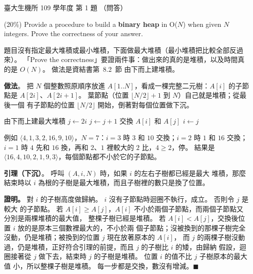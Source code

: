 \begin{pastexam}[label={px:ntu-109-bime-ds-01}]{臺大生機所 109 學年度 第 1 題}
（問答）

(20\%) Provide a procedure to build a \textbf{binary heap} in O($N$) when given $N$ integers.
Prove the correctness of your answer.
\end{pastexam}

\begin{pastsoln}
題目沒有指定最大堆積或最小堆積，下面做最大堆積（最小堆積把比較全部反過來）。 「Prove the
correctness」要證兩件事：做出來的真的是堆積，以及時間真的是 $O(N)$。 做法是資結書第~8.2~節
由下而上建堆積。

\textbf{做法}。 把 $N$ 個整數照原順序放進 $A[1..N]$，看成一棵完整二元樹：$A[i]$ 的子節點是
$A[2i]$、$A[2i+1]$。 葉節點（位置 $\lfloor N/2 \rfloor + 1$ 到 $N$）自己就是堆積；從最後一個
有子節點的位置 $\lfloor N/2 \rfloor$ 開始，倒著對每個位置做下沉。
\begin{pseudo}{由下而上建最大堆積}
        \State $j \gets 2i$ 
            \State $j \gets j + 1$ 
        \EndIf
            \State \Return
        \EndIf
        \State 交換 $A[i]$ 和 $A[j]$
        \State $i \gets j$
    \EndWhile
\EndProcedure
\Statex
{}
        \State {}
    \EndFor
\EndProcedure
\end{pseudo}
例如 $\langle 4, 1, 3, 2, 16, 9, 10 \rangle$，$N = 7$：$i = 3$ 時 $3$ 和 $10$ 交換；$i = 2$ 時
$1$ 和 $16$ 交換；$i = 1$ 時 $4$ 先和 $16$ 換，再和 $2$、$1$ 裡較大的 $2$ 比，$4 \ge 2$，停。
結果是 $\langle 16, 4, 10, 2, 1, 9, 3 \rangle$，每個節點都不小於它的子節點。

\textbf{引理（下沉）}。 呼叫 $(A, i, N)$ 時，如果 $i$ 的左右子樹都已經是最大
堆積，那麼結束時以 $i$ 為根的子樹是最大堆積，而且子樹裡的數只是換了位置。

\textbf{證明。} 對 $i$ 的子樹高度做歸納。 $i$ 沒有子節點時迴圈不執行，成立。 否則令 $j$ 是較大
的子節點。 若 $A[i] \ge A[j]$，$A[i]$ 不小於兩個子節點，而兩個子節點又分別是兩棵堆積的最大值，
整棵子樹已經是堆積。 若 $A[i] < A[j]$，交換後位置 $i$ 放的是原本三個數裡最大的，不小於兩
個子節點；沒被換到的那棵子樹完全沒動，仍是堆積；被換到的位置 $j$ 現在放著原本的 $A[i]$，
而 $j$ 的兩棵子樹沒動過，仍是堆積，正好符合引理的前提，而且 $j$ 的子樹比 $i$ 的矮，由歸納
假設，迴圈接著從 $j$ 做下去，結束時 $j$ 的子樹是堆積。 位置 $i$ 的值不比 $j$ 子樹原本的最大值
小，所以整棵子樹是堆積。 每一步都是交換，數沒有增減。\hfill$\blacksquare$


\end{pastsoln}
